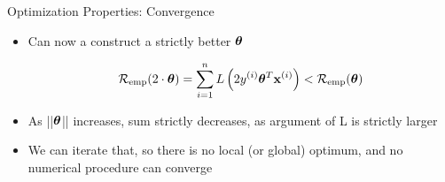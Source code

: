 \documentclass[11pt,compress,t,notes=noshow, xcolor=table]{beamer}
\begin{document}
\begin{vbframe}{Optimization Properties: Convergence}
\begin{itemize}



   
  
\item Can now a construct a strictly better $\bm{\theta}$

$$    \mathcal{R}_{\text{emp}}(2 \cdot \bm{\theta}) = \sum\limits_{i=1}^n  
    L \left( 2 y^{(i)} \bm{\theta}^T \mathbf{x}^{(i)}  
    \right) < \mathcal{R}_{\text{emp}}(\bm{\theta})
$$

\item As ||$\bm{\theta}$|| increases, sum strictly decreases, as argument of L is strictly larger

\item We can iterate that, so there is no local (or global) optimum, and no numerical procedure can converge
  \end{itemize}


\end{vbframe}
\end{document}
